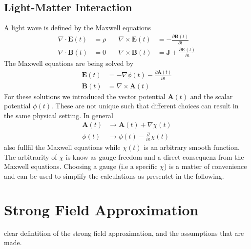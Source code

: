\subsection{Light-Matter Interaction}
A light wave is defined by the Maxwell equations
\begin{equation}
    \begin{aligned}
        \nabla \cdot \mathbf{E}(t) &= \rho \quad & \nabla \times \mathbf{E}(t) &= -\frac{\partial \mathbf{B}(t)}{\partial t} \\
        \nabla \cdot \mathbf{B}(t) &= 0 \quad & \nabla \times \mathbf{B}(t) &= \mathbf{J} + \frac{\partial \mathbf{E}(t)}{\partial t}
    \end{aligned}
\end{equation}
The Maxwell equations are being solved by
\begin{equation}
    \begin{aligned}
        \mathbf{E}(t) &= -\nabla \phi(t) - \frac{\partial \mathbf{A}(t)}{\partial t}\\
        \mathbf{B}(t) &= \nabla \times \mathbf{A}(t)
    \end{aligned}
\end{equation}
For these solutions we introduced the vector potential $\mathbf{A}(t)$ and the scalar potential $\phi(t)$. 
These are not unique such that different choices can result in the same physical setting. In general
\begin{equation}
    \begin{align}
        \mathbf{A}(t) &\to \mathbf{A}(t) + \nabla \chi(t) \\
        \phi(t) &\to \phi(t) - \frac{\partial}{\partial t} \chi(t)    
    \end{align}
\end{equation}
also fullfil the Maxwell equations while $\chi(t)$ is an arbitrary smooth function. The arbitrarity of $\chi$ is know as gauge freedom and a direct consequenz from the Maxwell equations.
Choosing a gauge (i.e a specific $\chi$) is a matter of convenience and can be used to simplify the calculations as presentet in the following.



\newpage
\section{Strong Field Approximation}

clear defintition of the strong field approximation, and the assumptions that are made.



